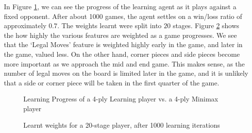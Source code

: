 \documentclass[11pt,twocolumn]{article}
\begin{document}
In Figure \ref{LearningProgress}, we can see the progress of the learning agent as it plays against a fixed opponent. After about 1000 games, the agent settles on a win/loss ratio of approximately $0.7$.
The weights learnt were split into $20$ stages. Figure \ref{WeightsOverTime} shows the how highly the various features are weighted as a game progresses. We see that the `Legal Moves' feature is weighted highly early in the game, and later in the game, valued less. On the other hand, corner pieces and side pieces become more important as we approach the mid and end game. This makes sense, as the number of legal moves on the board is limited later in the game, and it is unlikely that a side or corner piece will be taken in the first quarter of the game.

\begin{figure}[H] %
    \caption{Learning Progress of a 4-ply Learning player vs. a 4-ply Minimax player}
    \label{LearningProgress}
\end{figure}

\begin{center}
    \begin{figure}[H]
        \caption{Learnt weights for a 20-stage player, after 1000 learning iterations} 
        \label{WeightsOverTime}
    \end{figure}
\end{center}
\clearpage
\end{document}
